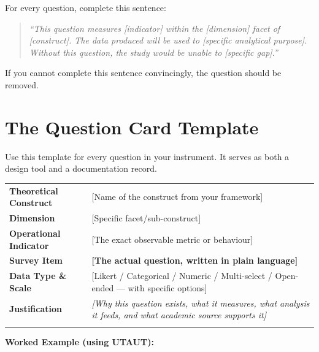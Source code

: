 \documentclass[12pt,a4paper]{article}
\begin{document}
For every question, complete this sentence:

\begin{quote}
\textit{``This question measures [indicator] within the [dimension] facet of [construct]. The data produced will be used to [specific analytical purpose]. Without this question, the study would be unable to [specific gap].''}
\end{quote}

If you cannot complete this sentence convincingly, the question should be removed.

\newpage

\section{The Question Card Template}

Use this template for every question in your instrument. It serves as both a design tool and a documentation record.

\vspace{8pt}

\noindent\begin{tabularx}{\textwidth}{@{}>{\bfseries\small}L{3.2cm}|X@{}}
\hline
Theoretical Construct & [Name of the construct from your framework] \\
Dimension & [Specific facet/sub-construct] \\
Operational Indicator & [The exact observable metric or behaviour] \\
\hline
{}\textbf{\color{navy}Survey Item} & \textbf{\color{navy}[The actual question, written in plain language]} \\
\hline
Data Type \& Scale & [Likert / Categorical / Numeric / Multi-select / Open-ended --- with specific options] \\
Justification & \textit{[Why this question exists, what it measures, what analysis it feeds, and what academic source supports it]} \\
\hline
\end{tabularx}

\vspace{12pt}

\noindent\textbf{Worked Example (using UTAUT):}

\vspace{8pt}
\end{document}
